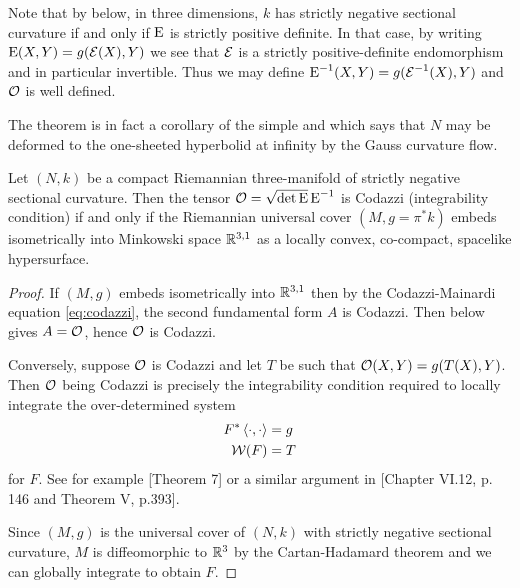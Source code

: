 \documentclass[a4paper, 12pt]{amsart}
\begin{document}
\begin{rem}
Note that by  below, in three dimensions, \(k\) has strictly negative sectional curvature if and only if \(\operatorname{E}\) is strictly positive definite. In that case, by writing \(\operatorname{E}(X, Y) = g(\operatorname{\mathcal{E}}(X), Y)\) we see that \(\operatorname{\mathcal{E}}\) is a strictly positive-definite endomorphism and in particular invertible. Thus we may define \(\operatorname{E}^{-1} (X, Y) = g(\operatorname{\mathcal{E}}^{-1} (X), Y)\) and \(\operatorname{\mathcal{O}}\) is well defined.
\end{rem}

The theorem is in fact a corollary of the simple  and \cite[Theorem 1.1]{MR3344442} which says that \(N\) may be deformed to the one-sheeted hyperbolid at infinity by the Gauss curvature flow.

\begin{thm}
\label{thm:intg_embed}
Let \((N, k)\) be a compact Riemannian three-manifold of strictly negative sectional curvature. Then the tensor \(\operatorname{\mathcal{O}} = \sqrt{\det \operatorname{E}} \operatorname{E}^{-1}\) is Codazzi (integrability condition) if and only if the Riemannian universal cover \((M, g = \pi^{\ast} k)\) embeds isometrically into Minkowski space \(\mathbb{R}^{3,1}\) as a locally convex, co-compact, spacelike hypersurface.
\end{thm}

\begin{proof}
If \((M, g)\) embeds isometrically into \(\mathbb{R}^{3,1}\) then by the Codazzi-Mainardi equation \eqref{eq:codazzi}, the second fundamental form \(A\) is Codazzi. Then  below gives \(A = \operatorname{\mathcal{O}}\), hence \(\operatorname{\mathcal{O}}\) is Codazzi.

Conversely, suppose \(\operatorname{\mathcal{O}}\) is Codazzi and let \(T\) be such that \(\operatorname{\mathcal{O}}(X, Y) = g(T(X), Y)\). Then \(\operatorname{\mathcal{O}}\) being Codazzi is precisely the integrability condition required to locally integrate the over-determined system
\begin{align*}
F^{\ast} \left\langle \cdot,\cdot \right\rangle &= g \\
\operatorname{\mathcal{W}}(F) &= T
\end{align*}
for \(F\). See for example \cite{MR1713298}[Theorem 7] or a similar argument in \cite{MR1013365}[Chapter VI.12, p. 146 and Theorem V, p.393].

Since \((M, g)\) is the universal cover of \((N, k)\) with strictly negative sectional curvature, \(M\) is diffeomorphic to \(\mathbb{R}^3\) by the Cartan-Hadamard theorem and we can globally integrate to obtain \(F\).
\end{proof}
\end{document}
